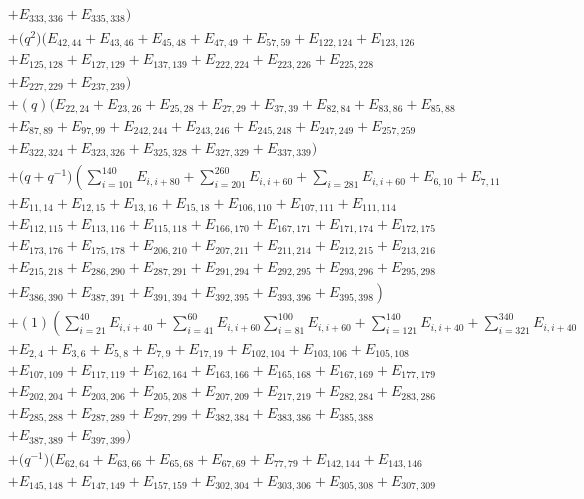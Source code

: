 \documentclass[10pt,a4paper]{amsart}
\numberwithin{equation}{section}
\theoremstyle{definition}
\begin{document}
\begin{align*}
&+E_{333,336}+E_{335,338})\\
&+\bigl(q^2\bigr)(E_{42,44}+E_{43,46}+E_{45,48}+E_{47,49}+E_{57,59}+E_{122,124}+E_{123,126}\\
&+E_{125,128}+E_{127,129}+E_{137,139}+E_{222,224}+E_{223,226}+E_{225,228}\\
&+E_{227,229}+E_{237,239})\\
&+(q)(E_{22,24}+E_{23,26}+E_{25,28}+E_{27,29}+E_{37,39}+E_{82,84}+E_{83,86}+E_{85,88}\\
&+E_{87,89}+E_{97,99}+E_{242,244}+E_{243,246}+E_{245,248}+E_{247,249}+E_{257,259}\\
&+E_{322,324}+E_{323,326}+E_{325,328}+E_{327,329}+E_{337,339})
\\
&+\bigl(q + q^{-1}\bigr)\left(\sum_{i=101}^{140} E_{i, i+80} +\sum_{i=201}^{260} E_{i,i+60} + \sum_{i=281} E_{i,i+60} + E_{6,10}+E_{7,11}\right. \\
&+E_{11,14}
+E_{12,15}+E_{13,16}+E_{15,18}+E_{106,110}+E_{107,111}+E_{111,114}\\
&+E_{112,115}+E_{113,116}+E_{115,118}+E_{166,170}+E_{167,171}+E_{171,174}+E_{172,175}\\
&+E_{173,176}+E_{175,178}+E_{206,210}+E_{207,211}+E_{211,214}+E_{212,215}+E_{213,216}\\
&+E_{215,218}+E_{286,290}+E_{287,291}+E_{291,294}+E_{292,295}+E_{293,296}+E_{295,298}\\
&\left.+E_{386,390}+E_{387,391}+E_{391,394}+E_{392,395}+E_{393,396}+E_{395,398}\right)
\\
&+(1)\left(\sum_{i=21}^{40}E_{i,i+40} +\sum_{i=41}^{60}E_{i,i+60} \sum_{i=81}^{100}E_{i,i+60} + \sum_{i=121}^{140}E_{i,i+40} +\sum_{i=321}^{340} E_{i,i+40} \right. \\
&+E_{2,4}+E_{3,6}+E_{5,8}+E_{7,9}+E_{17,19}+E_{102,104}+E_{103,106}+E_{105,108}\\
&+E_{107,109}+E_{117,119}+E_{162,164}+E_{163,166}+E_{165,168}+E_{167,169}+E_{177,179}\\
&+E_{202,204}+E_{203,206}+E_{205,208}+E_{207,209}+E_{217,219}+E_{282,284}+E_{283,286}\\
&+E_{285,288}+E_{287,289}+E_{297,299}+E_{382,384}+E_{383,386} +E_{385,388}\\
&+E_{387,389}+E_{397,399})
\\
&+\bigl(q^{-1}\bigr)(E_{62,64}+E_{63,66}+E_{65,68}+E_{67,69}+E_{77,79}+E_{142,144}+E_{143,146}\\
&+E_{145,148}+E_{147,149}+E_{157,159}+E_{302,304}+E_{303,306}+E_{305,308}+E_{307,309}\\

\end{align*}
\end{document}
